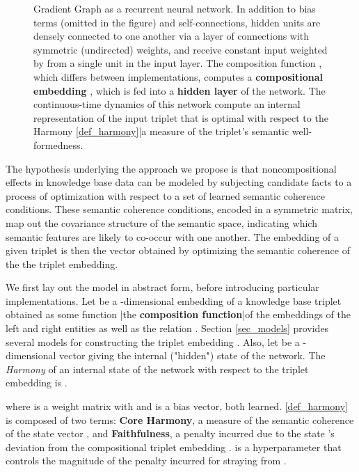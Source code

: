 \documentclass[a4paper,10pt]{article}
\def\layersep{1.5cm}
\begin{document}
\begin{figure}[!h]
\caption{Gradient Graph as a recurrent neural network. In addition to bias terms (omitted in the figure) and self-connections, hidden units are densely connected to one another via a layer of connections with symmetric (undirected) weights, and receive constant input weighted by  from a single unit in the input layer. The composition function , which differs between implementations, computes a \textbf{compositional embedding} , which is fed into a \textbf{hidden layer}  of the network. The continuous-time dynamics of this network compute an internal representation  of the input triplet that is optimal with respect to the Harmony \ref{def_harmony}|a measure of the triplet's semantic well-formedness. } \label{fig_network_diagram}
\end{figure}

The hypothesis underlying the approach we propose is that noncompositional effects in knowledge base data can be modeled by subjecting candidate facts to a process of optimization with respect to a set of learned semantic coherence conditions. These semantic coherence conditions, encoded in a symmetric matrix, map out the covariance structure of the semantic space, indicating which semantic features are likely to co-occur with one another. The embedding of a given triplet is then the vector obtained by optimizing the semantic coherence of the the triplet embedding. 

We first lay out the model in abstract form, before introducing particular implementations. Let  be a -dimensional embedding of a knowledge base triplet  obtained as some function |the \textbf{composition function}|of the embeddings of the left and right entities as well as the relation . Section \ref{sec_models} provides several models for constructing the triplet embedding . Also, let  be a -dimensional vector giving the internal ("hidden") state of the network. The \emph{Harmony} of an internal state  of the network with respect to the triplet embedding  is
\ex. {\small  } \label{def_harmony}

where  is a  weight matrix with  and  is a bias vector, both learned. \ref{def_harmony} is composed of two terms: {\color{blue!60} \textbf{Core Harmony}}, a measure of the semantic coherence of the state vector , and {\color{red!70} \textbf{Faithfulness}}, a penalty incurred due to the state 's deviation from the compositional triplet embedding .  is a hyperparameter that controls the magnitude of the penalty incurred for straying from . 
\end{document}
